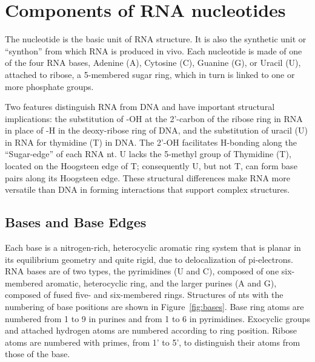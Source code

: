 \section{Components of RNA nucleotides}

The nucleotide is the basic unit of RNA structure. It is also the synthetic unit
or “synthon” from which RNA is produced in vivo. Each nucleotide is made of one
of the four RNA bases, Adenine (A), Cytosine (C), Guanine (G), or Uracil (U),
attached to ribose, a 5-membered sugar ring, which in turn is linked to one or
more phosphate groups. 

Two features distinguish RNA from DNA and have important structural
implications: the substitution of -OH at the 2'-carbon of the ribose ring in RNA
in place of -H in the deoxy-ribose ring of DNA, and the substitution of uracil
(U) in RNA for thymidine (T) in DNA\@. The 2’-OH facilitates H-bonding along the
``Sugar-edge'' of each RNA nt. U lacks the 5-methyl group of Thymidine (T),
located on the Hoogsteen edge of T; consequently U, but not T, can form base
pairs along its Hoogsteen edge. These structural differences make RNA more
versatile than DNA in forming interactions that support complex structures.

\subsection{Bases and Base Edges}

Each base is a nitrogen-rich, heterocyclic aromatic ring system that is planar
in its equilibrium geometry and quite rigid, due to delocalization of
pi-electrons. RNA bases are of two types, the pyrimidines (U and C), composed of
one six-membered aromatic, heterocyclic ring, and the larger purines (A and G),
composed of fused five- and six-membered rings. Structures of nts with the
numbering of base positions are shown in Figure~\ref{fig:bases}. Base ring atoms are numbered
from 1 to 9 in purines and from 1 to 6 in pyrimidines. Exocyclic groups and
attached hydrogen atoms are numbered according to ring position. Ribose atoms
are numbered with primes, from 1' to 5', to distinguish their atoms from those
of the base. 


